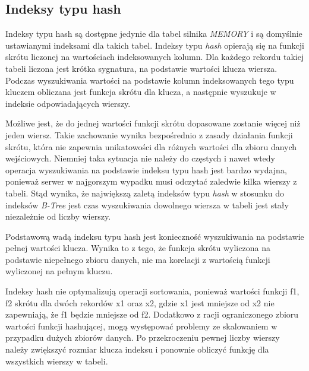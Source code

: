 
\subsection{Indeksy typu hash}
Indeksy typu hash są dostępne jedynie dla tabel silnika \textit{MEMORY} i są domyślnie ustawianymi indeksami dla takich tabel. Indeksy typu \textit{hash} opierają się na funkcji skrótu liczonej na wartościach indeksowanych kolumn. Dla każdego rekordu takiej tabeli liczona jest krótka sygnatura, na podstawie wartości klucza wiersza. Podczas wyszukiwania wartości na podstawie kolumn indeksowanych tego typu kluczem obliczana jest funkcja skrótu dla klucza, a następnie wyszukuje w indeksie odpowiadających wierszy. 

Możliwe jest, że do jednej wartości funkcji skrótu dopasowane zostanie więcej niż jeden wiersz. Takie zachowanie wynika bezpośrednio z zasady działania funkcji skrótu, która nie zapewnia unikatowości dla różnych wartości dla zbioru danych wejściowych. Niemniej taka sytuacja nie należy do częstych i nawet wtedy operacja wyszukiwania na podstawie indeksu typu hash jest bardzo wydajna, ponieważ serwer w najgorszym wypadku musi odczytać zaledwie kilka wierszy z tabeli. Stąd wynika, że największą zaletą indeksów typu \textit{hash} w stosunku do indeksów \textit{B-Tree} jest czas wyszukiwania dowolnego wiersza w tabeli jest stały niezależnie od liczby wierszy. 

Podstawową wadą indeksu typu hash jest konieczność wyszukiwania na podstawie pełnej wartości klucza. Wynika to z tego, że funkcja skrótu wyliczona na podstawie niepełnego zbioru danych, nie ma korelacji z wartością funkcji wyliczonej na pełnym kluczu. 

Indeksy hash nie optymalizują operacji sortowania, ponieważ wartości funkcji f1, f2 skrótu dla dwóch rekordów x1 oraz x2, gdzie x1 jest mniejsze od x2 nie zapewniają, że f1 będzie mniejsze od f2. Dodatkowo z racji ograniczonego zbioru wartości funkcji hashującej, mogą występować problemy ze skalowaniem w przypadku dużych zbiorów danych. Po przekroczeniu pewnej liczby wierszy należy zwiększyć rozmiar klucza indeksu i ponownie obliczyć funkcję dla wszystkich wierszy w tabeli.
